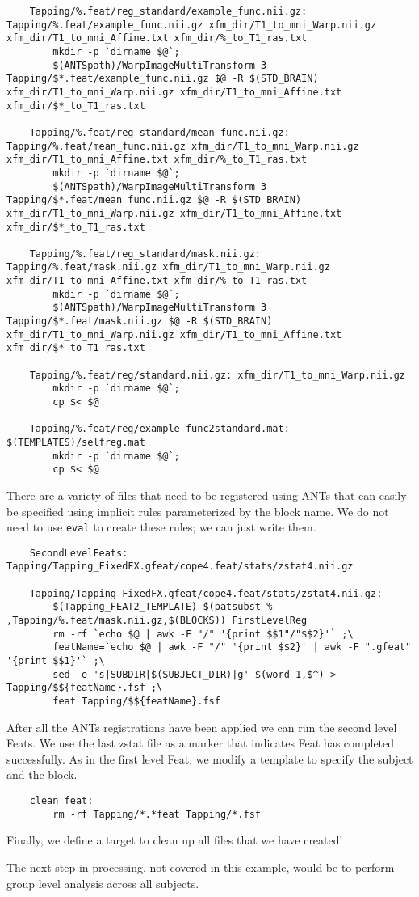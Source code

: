 \begin{lstlisting}
	Tapping/%.feat/reg_standard/example_func.nii.gz: Tapping/%.feat/example_func.nii.gz xfm_dir/T1_to_mni_Warp.nii.gz xfm_dir/T1_to_mni_Affine.txt xfm_dir/%_to_T1_ras.txt
		mkdir -p `dirname $@`;
		$(ANTSpath)/WarpImageMultiTransform 3 Tapping/$*.feat/example_func.nii.gz $@ -R $(STD_BRAIN) xfm_dir/T1_to_mni_Warp.nii.gz xfm_dir/T1_to_mni_Affine.txt xfm_dir/$*_to_T1_ras.txt

	Tapping/%.feat/reg_standard/mean_func.nii.gz: Tapping/%.feat/mean_func.nii.gz xfm_dir/T1_to_mni_Warp.nii.gz xfm_dir/T1_to_mni_Affine.txt xfm_dir/%_to_T1_ras.txt
		mkdir -p `dirname $@`;
		$(ANTSpath)/WarpImageMultiTransform 3 Tapping/$*.feat/mean_func.nii.gz $@ -R $(STD_BRAIN) xfm_dir/T1_to_mni_Warp.nii.gz xfm_dir/T1_to_mni_Affine.txt xfm_dir/$*_to_T1_ras.txt

	Tapping/%.feat/reg_standard/mask.nii.gz: Tapping/%.feat/mask.nii.gz xfm_dir/T1_to_mni_Warp.nii.gz xfm_dir/T1_to_mni_Affine.txt xfm_dir/%_to_T1_ras.txt
		mkdir -p `dirname $@`;
		$(ANTSpath)/WarpImageMultiTransform 3 Tapping/$*.feat/mask.nii.gz $@ -R $(STD_BRAIN) xfm_dir/T1_to_mni_Warp.nii.gz xfm_dir/T1_to_mni_Affine.txt xfm_dir/$*_to_T1_ras.txt

	Tapping/%.feat/reg/standard.nii.gz: xfm_dir/T1_to_mni_Warp.nii.gz
		mkdir -p `dirname $@`;
		cp $< $@

	Tapping/%.feat/reg/example_func2standard.mat: $(TEMPLATES)/selfreg.mat
		mkdir -p `dirname $@`;
		cp $< $@
\end{lstlisting}
There are a variety of files that need to be registered using ANTs
that can easily be specified using implicit rules parameterized by the
block name. We do not need to use \texttt{eval} to create these rules;
we can just write them. 

\begin{lstlisting}
	SecondLevelFeats: Tapping/Tapping_FixedFX.gfeat/cope4.feat/stats/zstat4.nii.gz

	Tapping/Tapping_FixedFX.gfeat/cope4.feat/stats/zstat4.nii.gz:
        $(Tapping_FEAT2_TEMPLATE) $(patsubst % ,Tapping/%.feat/mask.nii.gz,$(BLOCKS)) FirstLevelReg
		rm -rf `echo $@ | awk -F "/" '{print $$1"/"$$2}'` ;\
		featName=`echo $@ | awk -F "/" '{print $$2}' | awk -F ".gfeat" '{print $$1}'` ;\
		sed -e 's|SUBDIR|$(SUBJECT_DIR)|g' $(word 1,$^) > Tapping/$${featName}.fsf ;\
		feat Tapping/$${featName}.fsf
\end{lstlisting}
After all the ANTs registrations have been applied we can run the
second level Feats. We use the last zstat file as a marker that
indicates Feat has completed successfully. As in the first level Feat, we modify a template
to specify the subject and the block.

\begin{lstlisting}
	clean_feat:
		rm -rf Tapping/*.*feat Tapping/*.fsf
\end{lstlisting}

Finally, we define a target to clean up all files that we have
created! 

The next step in processing, not covered in this example, would be to
perform group level analysis across all subjects.